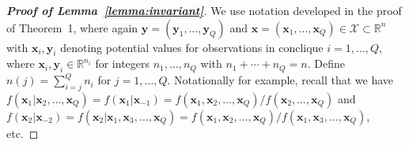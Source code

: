 \documentclass[12pt]{article}
\theoremstyle{definition}
\begin{document}
\begin{proof}[\bf Proof of Lemma~\ref{lemma:invariant}]
We use notation developed in the proof of Theorem~1, where again $\boldsymbol y = (\boldsymbol y_1, \dots, \boldsymbol y_Q)$ and  $\boldsymbol x = (\boldsymbol x_1, \dots, \boldsymbol x_Q)\in\mathcal{X}\subset \mathbb{R}^n$  with $\boldsymbol x_i, \boldsymbol y_i$ denoting potential values for observations in conclique $i=1, \dots, Q$, where $\boldsymbol x_i, \boldsymbol y_i \in \mathbb{R}^{n_i}$ for integers $n_1, \dots, n_Q$ with $n_1+\cdots+n_Q=n$. Define $n(j) = \sum_{i = j}^Q n_i$ for $j=1,\ldots,Q$.
 Notationally for example, recall that we  have $ f(\boldsymbol x_1| \boldsymbol x_2,\ldots, \boldsymbol x_Q )= f(\boldsymbol x_1| \boldsymbol x_{-1})=
f(\boldsymbol x_1, \boldsymbol x_2,\ldots, \boldsymbol x_Q )/f(\boldsymbol x_2,\ldots, \boldsymbol x_Q )$ and
$  f(\boldsymbol x_2| \boldsymbol x_{-2})= f(\boldsymbol x_2| \boldsymbol x_1,\boldsymbol x_3,\ldots, \boldsymbol x_Q )=
f(\boldsymbol x_1, \boldsymbol x_2,\ldots, \boldsymbol x_Q )/f(\boldsymbol x_1,\boldsymbol x_3,\ldots, \boldsymbol x_Q )$, etc.


\end{proof}
\end{document}
